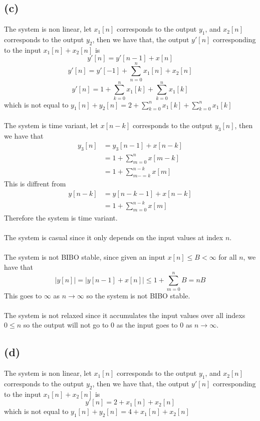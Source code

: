 \subsection*{(c)}
The system is non linear, let 
$x_1[n]$ corresponds to the output $y_1$, and $x_2[n]$ corresponds to the output $y_2$, then we have that, 
the output $y'[n]$ corresponding to the input $x_1[n]+x_2[n]$ is
$$y'[n]=y'[n-1]+x[n]$$
$$y'[n]=y'[-1]+\sum_{n=0}^{n}x_1[n]+x_2[n]$$
$$y'[n]=1+\sum_{k=0}^{n}x_1[k]+\sum_{k=0}^{n}x_1[k]$$
which is not equal to $y_1[n]+y_2[n]=2+\sum_{k=0}^{n}x_1[k]+\sum_{k=0}^{n}x_1[k]$\\\\
The system is time variant, let $x[n-k]$ corresponds to the output $y_3[n]$, then we have that
\begin{align*}
    y_3[n]&=y_3[n-1]+x[n-k]\\
    &=1+\sum_{m=0}^{n}x[m-k]\\
    &=1+\sum_{m-=k}^{n-k}x[m]
\end{align*}
This is diffrent from 
\begin{align*}
    y[n-k]&=y[n-k-1]+x[n-k]\\
    &=1+\sum_{m=0}^{n-k}x[m]
\end{align*}
Therefore the system is time variant.\\\\
The system is casual since it only depends on the input values at index $n$.\\\\
The system is not BIBO stable, since given an input $x[n]\leq B<\infty$ for all $n$, we have that
$$|y[n]|=|y[n-1]+x[n]|\leq 1+\sum_{m=0}^{n}B =nB$$
This goes to $\infty$ as $n\to\infty$ so the system is not BIBO stable.\\\\
The system is not relaxed since it accumulates the input values over all indexs $0\leq n$ so
the output will not go to $0$ as the input goes to $0$ as $n\to\infty$.
\subsection*{(d)}
The system is non linear, let 
$x_1[n]$ corresponds to the output $y_1$, and $x_2[n]$ corresponds to the output $y_2$, then we have that, 
the output $y'[n]$ corresponding to the input $x_1[n]+x_2[n]$ is
$$y'[n]=2+x_1[n]+x_2[n]$$
which is not equal to $y_1[n]+y_2[n]=4+x_1[n]+x_2[n]$\\\\

